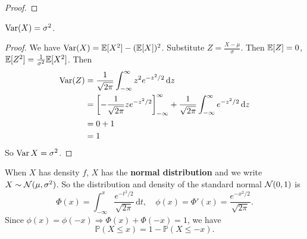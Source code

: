 \begin{example}
\begin{proof}
    \end{proof}
    \begin{proposition}
    $\operatorname{Var}(X) = \sigma^2$.
    \end{proposition}
    \begin{proof}
    We have $\operatorname{Var} (X) = {\mathbb{E}}[X^2] - ({\mathbb{E}}[X])^2$. Substitute $Z = \frac{X - \mu}{\sigma}$. Then ${\mathbb{E}}[Z] = 0$, ${\mathbb{E}}[Z^2] = \frac{1}{\sigma^2}{\mathbb{E}}[X^2]$. Then
    \begin{align*}
        \operatorname{Var}(Z) &= \frac{1}{\sqrt{2\pi}} \int_{-\infty}^\infty z^2 e^{-z^2/2}\,\mathrm{d} z\\
        &= \left[-\frac{1}{\sqrt{2\pi}}ze^{-z^2/2}\right]_{-\infty}^\infty + \frac{1}{\sqrt{2\pi}}\int_{-\infty}^\infty e^{-z^2/2}\,\mathrm{d} z\\
        &= 0 + 1\\
        &= 1
    \end{align*}
    So $\operatorname{Var} X = \sigma^2$.
    \end{proof}
    When $X$ has density $ f $, $X$ has the \textbf{normal distribution} and we write $ X \sim {\mathcal{N}}(\mu,\sigma^2) $. So the distribution and density of the standard normal $ {\mathcal{N}}(0,1) $ is
    \[
        \Phi(x)=\int_{-\infty}^x\frac{e^{-t^2/2}}{\sqrt{2\pi}}\,\mathrm dt,\quad\phi(x)=\Phi'(x)=\frac{e^{-x^2/2}}{\sqrt{2\pi}}.
    \]
    Since $ \phi(x)=\phi(-x) \Rightarrow \Phi(x)+\Phi(-x)=1 $, we have 
    \[
        \mathbb{P}(X\le x)=1-\mathbb{P}(X\le -x).
    \]
\end{example}